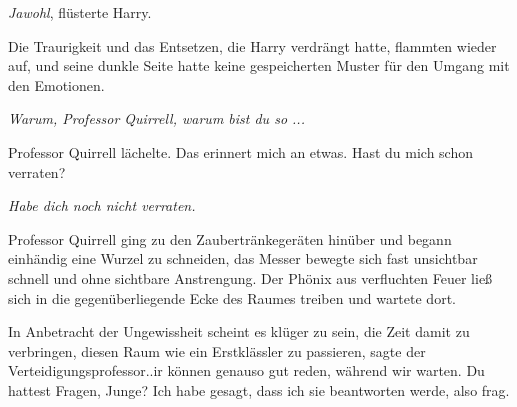 \glqq{}\emph{Jawohl}\grqq{}, flüsterte Harry.

Die Traurigkeit und das Entsetzen, die Harry verdrängt hatte, flammten wieder
auf, und seine dunkle Seite hatte keine gespeicherten Muster für den Umgang mit
den Emotionen.

\emph{Warum, Professor Quirrell, warum bist du so ...}

Professor Quirrell lächelte. \glqq{}Das erinnert mich an etwas. Hast du mich
schon verraten?\grqq{}

\glqq{}\emph{Habe dich noch nicht verraten.}\grqq{}

Professor Quirrell ging zu den Zaubertränkegeräten hinüber und begann einhändig
eine Wurzel zu schneiden, das Messer bewegte sich fast unsichtbar schnell und
ohne sichtbare Anstrengung. Der Phönix aus verfluchten Feuer ließ sich in die
gegenüberliegende Ecke des Raumes treiben und wartete dort.

\glqq{}In Anbetracht der Ungewissheit scheint es klüger zu sein, die Zeit damit
zu verbringen, diesen Raum wie ein Erstklässler zu passieren\grqq{}, sagte der
Verteidigungsprofessor.\grqq{}.ir können genauso gut reden, während wir warten.
Du hattest Fragen, Junge? Ich habe gesagt, dass ich sie beantworten werde, also
frag.\grqq{}


